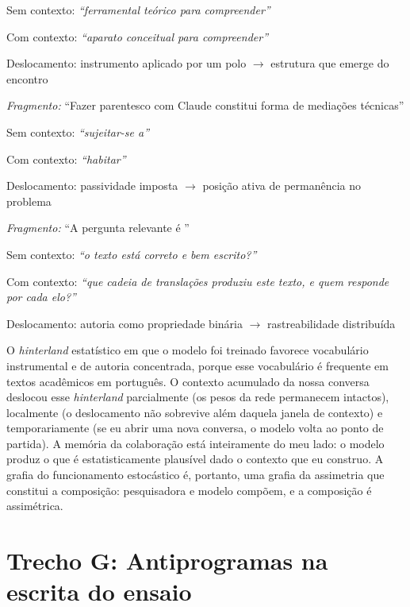 \noindent Sem contexto: \textit{``ferramental teórico para compreender''}

\noindent Com contexto: \textit{``aparato conceitual para compreender''}

\noindent Deslocamento: instrumento aplicado por um polo $\rightarrow$ estrutura que emerge do encontro

\medskip
\noindent\textit{Fragmento:} ``Fazer parentesco com Claude constitui forma de \underline{\hspace{2cm}} mediações técnicas''

\noindent Sem contexto: \textit{``sujeitar-se a''}

\noindent Com contexto: \textit{``habitar''}

\noindent Deslocamento: passividade imposta $\rightarrow$ posição ativa de permanência no problema

\medskip
\noindent\textit{Fragmento:} ``A pergunta relevante é \underline{\hspace{2cm}}''

\noindent Sem contexto: \textit{``o texto está correto e bem escrito?''}

\noindent Com contexto: \textit{``que cadeia de translações produziu este texto, e quem responde por cada elo?''}

\noindent Deslocamento: autoria como propriedade binária $\rightarrow$ rastreabilidade distribuída

O \textit{hinterland} estatístico em que o modelo foi treinado favorece vocabulário instrumental e de autoria concentrada, porque esse vocabulário é frequente em textos acadêmicos em português. O contexto acumulado da nossa conversa deslocou esse \textit{hinterland} parcialmente (os pesos da rede permanecem intactos), localmente (o deslocamento não sobrevive além daquela janela de contexto) e temporariamente (se eu abrir uma nova conversa, o modelo volta ao ponto de partida). A memória da colaboração está inteiramente do meu lado: o modelo produz o que é estatisticamente plausível dado o contexto que eu construo. A grafia do funcionamento estocástico é, portanto, uma grafia da assimetria que constitui a composição: pesquisadora e modelo compõem, e a composição é assimétrica.


\section*{Trecho G: Antiprogramas na escrita do ensaio}

